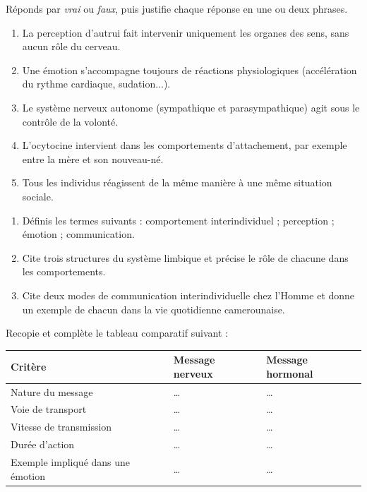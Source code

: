 \documentclass[11pt]{article}
\newcommand{\cle}[1]{{\popxbold\color{popdark}#1}}
\begin{document}
\begin{exercice}
Réponds par \emph{vrai} ou \emph{faux}, puis justifie chaque réponse en une ou deux phrases.
\begin{enumerate}
\item La perception d'autrui fait intervenir uniquement les organes des sens, sans aucun rôle du cerveau.
\item Une émotion s'accompagne toujours de réactions physiologiques (accélération du rythme cardiaque, sudation...).
\item Le système nerveux autonome (sympathique et parasympathique) agit sous le contrôle de la volonté.
\item L'ocytocine intervient dans les comportements d'attachement, par exemple entre la mère et son nouveau-né.
\item Tous les individus réagissent de la même manière à une même situation sociale.
\end{enumerate}
\end{exercice}

\begin{exercice}
\begin{enumerate}
\item Définis les termes suivants : \cle{comportement interindividuel} ; \cle{perception} ; \cle{émotion} ; \cle{communication}.
\item Cite trois structures du \cle{système limbique} et précise le rôle de chacune dans les comportements.
\item Cite deux modes de communication interindividuelle chez l'Homme et donne un exemple de chacun dans la vie quotidienne camerounaise.
\end{enumerate}
\end{exercice}

\begin{exercice}
Recopie et complète le tableau comparatif suivant :
\begin{center}
\begin{tabularx}{\linewidth}{|l|X|X|}
\hline
\rowcolor{popblueL} \textbf{Critère} & \textbf{Message nerveux} & \textbf{Message hormonal} \\
\hline
Nature du message & \ldots & \ldots \\
\hline
Voie de transport & \ldots & \ldots \\
\hline
Vitesse de transmission & \ldots & \ldots \\
\hline
Durée d'action & \ldots & \ldots \\
\hline
Exemple impliqué dans une émotion & \ldots & \ldots \\
\hline
\end{tabularx}
\end{center}
\end{exercice}
\end{document}
